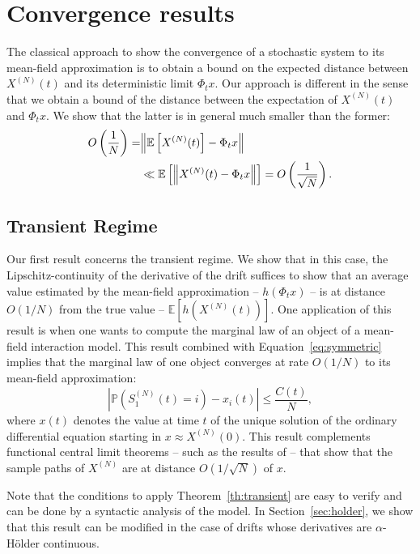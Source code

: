 \documentclass[acmlarge]{acmart}
\newcommand\SN{S^{(N)}}
\newcommand\XN{X^{(N)}}
\newcommand\esp[1]{{\mathchoice{\besp{#1}}{\sesp{#1}}{\sesp{#1}}{\sesp{#1}}}}
\newcommand\besp[1]{\mathbb{E}\left[#1\right]}
\newcommand\sesp[1]{\mathbb{E}[#1]}
\newcommand\norm[1]{{\mathchoice{\bnorm{#1}}{\snorm{#1}}{\snorm{#1}}{\snorm{#1}}}}
\newcommand\bnorm[1]{\left\|#1\right\|}
\newcommand\snorm[1]{\|#1\|}
\newcommand\abs[1]{\left|#1\right|}
\newcommand\p[1]{\left(#1\right)}
\newcommand\proba[1]{\mathbb{P}\left(#1\right)}
\begin{document}
\section{Convergence results}
\label{sec:convergence}

The classical approach to show the convergence of a stochastic system
to its mean-field approximation is to obtain a bound on the expected
distance between $\XN(t)$ and its deterministic limit $\Phi_tx$.
Our approach is different in the sense that we obtain a bound of the
distance between the expectation of $\XN(t)$ and $\Phi_tx$. We show
that the latter is in general much smaller than the former:
\begin{align*}
  O\p{\frac1N} =& \norm{\esp{\XN(t)} - \Phi_t x}\\
               &\ll \esp{\norm{\XN(t) - \Phi_t x}} =
                 O\p{\frac1{\sqrt{N}}}. 
\end{align*}


\subsection{Transient Regime}
\label{sec:transient}

Our first result concerns the transient regime. We show that in this
case, the Lipschitz-continuity of the derivative of the drift suffices
to show that an average value estimated by the mean-field
approximation -- $h(\Phi_tx)$ -- is at distance $O(1/N)$ from the true
value -- $\sesp{h(\XN(t))}$.  One application of this result is when
one wants to compute the marginal law of an object of a mean-field
interaction model.  This result combined with
Equation~\eqref{eq:symmetric} implies that the marginal law of one
object converges at rate $O(1/N)$ to its mean-field approximation:
\begin{equation*}
  \abs{\proba{\SN_1(t)=i} - x_i(t)} \le \frac{C(t)}{N},
\end{equation*}
where $x(t)$ denotes the value at time $t$ of the unique solution of
the ordinary differential equation starting in $x\approx\XN(0)$. This
result complements functional central limit theorems -- such as the
results of \cite{kurtz1978strong} -- that show that the sample paths
of $\XN$ are at distance $O(1/\sqrt{N})$ of $x$. %

Note that the conditions to apply Theorem~\ref{th:transient} are easy
to verify and can be done by a syntactic analysis of the model.  In
Section~\ref{sec:holder}, we show that this result can be modified in
the case of drifts whose derivatives are $\alpha$-Hölder continuous.
\end{document}
